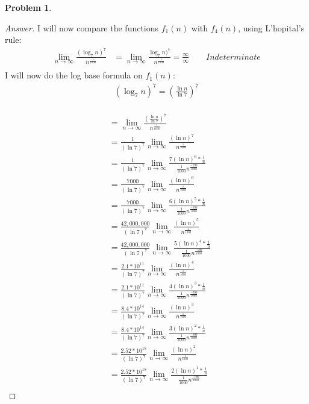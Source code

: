\documentclass[11pt]{article}
\theoremstyle{definition}
\theoremstyle{definition}
\newtheorem{required}{Problem}
\theoremstyle{definition}
\begin{document}
\begin{required}
\begin{enumerate} [label=(\alph*)]
\begin{proof}[Answer]
I will now compare the functions $f_1(n)$ with $f_4(n)$, using L'hopital's rule: \\
\begin{align*}
\lim_{n \to \infty} \frac{(\log_7 n)^7}{n^\frac{1}{1000}} &= \lim_{n \to \infty} \frac{\log_7 n)^7}{n^\frac{1}{1000}}  = \frac{\infty}{\infty} \qquad Indeterminate  \\
\end{align*}
I will now do the log base formula on $f_1(n)$: \\
\begin{align*}
(\log_7n)^{7} = (\frac{\ln n}{\ln 7})^{7}
\end{align*}
\\
\begin{align*}
&= \lim_{n \to \infty} \frac{(\frac{\ln n}{\ln 7})^{7}}{n^{\frac{1}{1000}}} \\ 
&= \frac{1}{(\ln 7)^{7}}\lim_{n \to \infty} \frac{(\ln n)^{7}}{n^{\frac{1}{1000}}} \\ 
&= \frac{1}{(\ln 7)^{7}}\lim_{n \to \infty} \frac{7(\ln n)^{6} * \frac{1}{n}}{\frac{1}{1000}n^{\frac{-999}{1000}}} \\
&= \frac{7000}{(\ln 7)^{7}}\lim_{n \to \infty} \frac{(\ln n)^{6}}{n^{\frac{1}{1000}}} \\
&= \frac{7000}{(\ln 7)^{7}}\lim_{n \to \infty} \frac{6(\ln n)^{5} * \frac{1}{n}}{\frac{1}{1000}n^{\frac{-999}{1000}}} \\
&= \frac{42,000,000}{(\ln 7)^{7}}\lim_{n \to \infty} \frac{(\ln n)^{5}}{n^{\frac{1}{1000}}} \\
&= \frac{42,000,000}{(\ln 7)^{7}}\lim_{n \to \infty} \frac{5(\ln n)^{4} * \frac{1}{n}}{\frac{1}{1000}n^{\frac{-999}{1000}}} \\
&= \frac{2.1*10^{11}}{(\ln 7)^{7}}\lim_{n \to \infty} \frac{(\ln n)^{4}}{n^{\frac{1}{1000}}} \\
&= \frac{2.1*10^{11}}{(\ln 7)^{7}}\lim_{n \to \infty} \frac{4(\ln n)^{3} * \frac{1}{n}}{\frac{1}{1000}n^{\frac{-999}{1000}}} \\
&= \frac{8.4*10^{14}}{(\ln 7)^{7}}\lim_{n \to \infty} \frac{(\ln n)^{3}}{n^{\frac{1}{1000}}} \\
&= \frac{8.4*10^{14}}{(\ln 7)^{7}}\lim_{n \to \infty} \frac{3(\ln n)^{2} * \frac{1}{n}}{\frac{1}{1000}n^{\frac{-999}{1000}}} \\
&= \frac{2.52*10^{18}}{(\ln 7)^{7}}\lim_{n \to \infty} \frac{(\ln n)^{2}}{n^{\frac{1}{1000}}} \\
&= \frac{2.52*10^{18}}{(\ln 7)^{7}}\lim_{n \to \infty} \frac{2(\ln n)^{1} * \frac{1}{n}}{\frac{1}{1000}n^{\frac{-999}{1000}}} \\

\end{align*}
\end{proof}
\end{enumerate}
\end{required}
\end{document}
